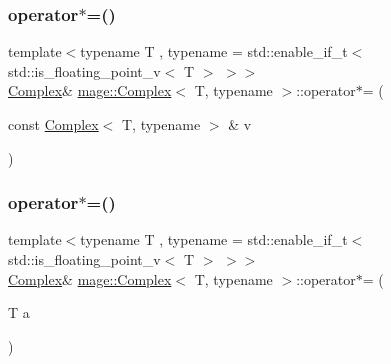 \subsubsection{\texorpdfstring{operator$\ast$=()}{operator*=()}\hspace{0.1cm}{\footnotesize\ttfamily [1/2]}}
{\footnotesize\ttfamily template$<$typename T , typename  = std\+::enable\+\_\+if\+\_\+t$<$ std\+::is\+\_\+floating\+\_\+point\+\_\+v$<$ T $>$ $>$$>$ \\
\mbox{\hyperlink{structmage_1_1_complex}{Complex}}\& \mbox{\hyperlink{structmage_1_1_complex}{mage\+::\+Complex}}$<$ T, typename $>$\+::operator$\ast$= (\begin{DoxyParamCaption}\item[{const \mbox{\hyperlink{structmage_1_1_complex}{Complex}}$<$ T, typename $>$ \&}]{v }\end{DoxyParamCaption})\hspace{0.3cm}{\ttfamily [noexcept]}}

\mbox{\label{structmage_1_1_complex_ab458e82ea17b7d0b07901c91bdab2e28}} 
\subsubsection{\texorpdfstring{operator$\ast$=()}{operator*=()}\hspace{0.1cm}{\footnotesize\ttfamily [2/2]}}
{\footnotesize\ttfamily template$<$typename T , typename  = std\+::enable\+\_\+if\+\_\+t$<$ std\+::is\+\_\+floating\+\_\+point\+\_\+v$<$ T $>$ $>$$>$ \\
\mbox{\hyperlink{structmage_1_1_complex}{Complex}}\& \mbox{\hyperlink{structmage_1_1_complex}{mage\+::\+Complex}}$<$ T, typename $>$\+::operator$\ast$= (\begin{DoxyParamCaption}\item[{T}]{a }\end{DoxyParamCaption})\hspace{0.3cm}{\ttfamily [noexcept]}}

\mbox{\label{structmage_1_1_complex_a90b404523f27f255ff44f9e19ed9c9b4}} 
